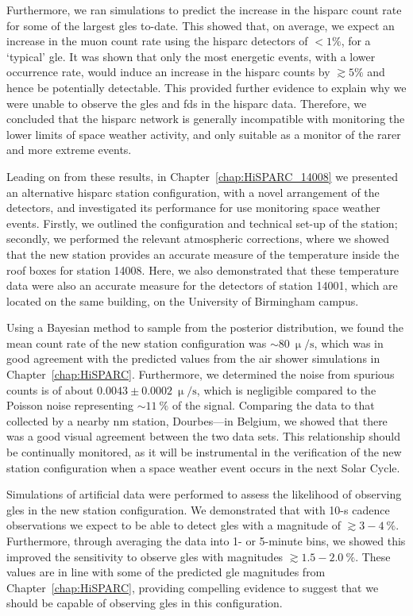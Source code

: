 Furthermore, we ran simulations to predict the increase in the \gls{hisparc} count rate for some of the largest \glspl{gle} to-date. This showed that, on average, we expect an increase in the muon count rate using the \gls{hisparc} detectors of $<1\%$, for a `typical' \gls{gle}. It was shown that only the most energetic events, with a lower occurrence rate, would induce an increase in the \gls{hisparc} counts by $\gtrsim5\%$ and hence be potentially detectable. This provided further evidence to explain why we were unable to observe the \glspl{gle} and \glspl{fd} in the \gls{hisparc} data. Therefore, we concluded that the \gls{hisparc} network is generally incompatible with monitoring the lower limits of space weather activity, and only suitable as a monitor of the rarer and more extreme events.


Leading on from these results, in Chapter~\ref{chap:HiSPARC_14008} we presented an alternative \gls{hisparc} station configuration, with a novel arrangement of the detectors, and investigated its performance for use monitoring space weather events. Firstly, we outlined the configuration and technical set-up of the station; secondly, we performed the relevant atmospheric corrections, where we showed that the new station provides an accurate measure of the temperature inside the roof boxes for station 14008. Here, we also demonstrated that these temperature data were also an accurate measure for the detectors of station 14001, which are located on the same building, on the University of Birmingham campus.

Using a Bayesian method to sample from the posterior distribution, we found the mean count rate of the new station configuration was $\sim80~\upmu/\mathrm{s}$, which was in good agreement with the predicted values from the air shower simulations in Chapter~\ref{chap:HiSPARC}. Furthermore, we determined the noise from spurious counts is of about $0.0043\pm0.0002~\upmu/\mathrm{s}$, which is negligible compared to the Poisson noise representing $\sim11~\%$ of the signal. Comparing the data to that collected by a nearby \gls{nm} station, Dourbes---in Belgium, we showed that there was a good visual agreement between the two data sets. This relationship should be continually monitored, as it will be instrumental in the verification of the new station configuration when a space weather event occurs in the next Solar Cycle.

Simulations of artificial data were performed to assess the likelihood of observing \glspl{gle} in the new station configuration. We demonstrated that with 10-s cadence observations we expect to be able to detect \glspl{gle} with a magnitude of $\gtrsim3-4~\%$. Furthermore, through averaging the data into 1- or 5-minute bins, we showed this improved the sensitivity to observe \glspl{gle} with magnitudes $\gtrsim1.5-2.0~\%$. These values are in line with some of the predicted \gls{gle} magnitudes from Chapter~\ref{chap:HiSPARC}, providing compelling evidence to suggest that we should be capable of observing \glspl{gle} in this configuration.

